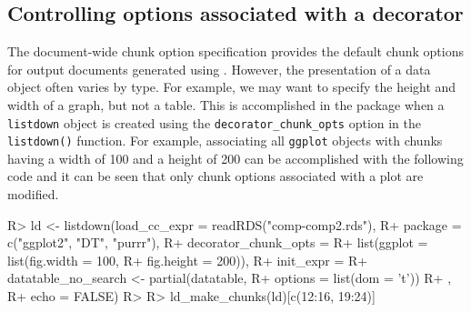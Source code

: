 \documentclass[
]{jss}
\begin{document}
\hypertarget{controlling-options-associated-with-a-decorator}{%
\subsection{Controlling options associated with a
decorator}\label{controlling-options-associated-with-a-decorator}}

The document-wide chunk option specification provides the default chunk
options for output documents generated using . However,
the presentation of a data object often varies by type. For example, we
may want to specify the height and width of a graph, but not a table.
This is accomplished in the  package when a
\texttt{listdown} object is created using the
\texttt{decorator\_chunk\_opts} option in the \texttt{listdown()}
function. For example, associating all \texttt{ggplot} objects with
 chunks having a width of 100 and a height of 200 can be
accomplished with the following code and it can be seen that only chunk
options associated with a plot are modified.

\begin{CodeChunk}

\begin{CodeInput}
R> ld <- listdown(load_cc_expr = readRDS("comp-comp2.rds"),
R+                package = c("ggplot2", "DT", "purrr"),
R+                decorator_chunk_opts = 
R+                  list(ggplot = list(fig.width = 100,
R+                                     fig.height = 200)),
R+                init_expr = {
R+                  datatable_no_search <- partial(datatable,
R+                                                 options = list(dom = 't'))
R+                  },
R+                echo = FALSE)
R> 
R> ld_make_chunks(ld)[c(12:16, 19:24)]
\end{CodeInput}

\end{CodeChunk}
\end{document}
